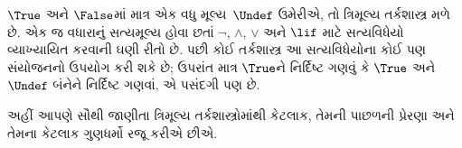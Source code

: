 \documentclass[../../../include/open-logic-section]{subfiles}
\begin{document}


$\True$ અને $\False$માં માત્ર એક વધુ મૂલ્ય~$\Undef$ ઉમેરીએ,
તો ત્રિમૂલ્ય તર્કશાસ્ત્ર મળે છે. એક જ વધારાનું સત્યમૂલ્ય
હોવા છતાં $\lnot$, $\land$, $\lor$ અને $\lif$ માટે
સત્યવિધેયો વ્યાખ્યાયિત કરવાની ઘણી રીતો છે. પછી કોઈ
તર્કશાસ્ત્ર આ સત્યવિધેયોના કોઈ પણ સંયોજનનો ઉપયોગ કરી શકે છે;
ઉપરાંત માત્ર $\True$ને નિર્દિષ્ટ ગણવું કે $\True$ અને~$\Undef$
બંનેને નિર્દિષ્ટ ગણવાં, એ પસંદગી પણ છે.

અહીં આપણે સૌથી જાણીતા ત્રિમૂલ્ય તર્કશાસ્ત્રોમાંથી કેટલાક,
તેમની પાછળની પ્રેરણા અને તેમના કેટલાક ગુણધર્મો રજૂ કરીએ છીએ.
\end{document}
